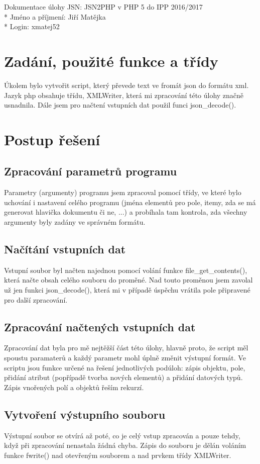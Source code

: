 \documentclass[a4paper, 10pt]{article}
\begin{document}
    Dokumentace úlohy JSN: JSN2PHP v PHP 5 do IPP 2016/2017 \\*
    Jméno a příjmení: Jiří Matějka \\*
    Login: xmatej52
    \section{Zadání, použité funkce a třídy}
        Úkolem bylo vytvořit script, který převede text ve fromát json do formátu
        xml. Jazyk php obsahuje třídu, XMLWriter, která mi zpracování této úlohy
        značně usnadnila. Dále jsem pro načtení vstupních dat použil funci
        json\_decode().
    \section{Postup řešení}
        \subsection{Zpracování parametrů programu}
            Parametry (argumenty) programu jsem zpracoval pomocí třídy, ve které
            bylo uchování i nastavení celého programu (jména elementů pro pole,
            itemy, zda se má generovat hlavička dokumentu či ne, ...) a probíhala
            tam kontrola, zda všechny argumenty byly zadány ve správném formátu.
        \subsection{Načítání vstupních dat}
            Vstupní soubor byl načten najednou pomocí volání funkce file\_get\_contents(),
            která načte obsah celého souboru do proměné. Nad touto proměnou jsem
            zavolal už jen funkci json\_decode(), která mi v případě úspěchu vrátila
            pole připravené pro další zpracování.
        \subsection{Zpracování načtených vstupních dat}
            Zpracování dat byla pro mě nejtěžší část této úlohy, hlavně proto, že
            script měl spoustu paramaterů a každý parametr mohl úplně změnit
            výstupní formát. Ve scriptu jsou funkce určené na řešení jednotlivých
            podúloh: zápis objektu, pole, přidání atribut (popřípadě tvorba nových
            elementů) a přidání datových typů. Zápis vnořených polí a objektů
            řeším rekurzí.
        \subsection{Vytvoření výstupního souboru}
            Výstupní soubor se otvírá až poté, co je celý vstup zpracován a pouze
            tehdy, když při zpracování nenastala žádná chyba. Zápis do souboru
            je dělán voláním funkce fwrite() nad otevřeným souborem a nad prvkem
            třídy XMLWriter.
\end{document}
